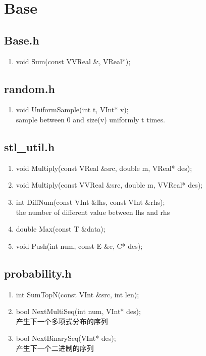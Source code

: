 \chapter{Base}
\section{Base.h}
\begin{enumerate}
\item void Sum(const VVReal \&, VReal*);
\end{enumerate}
\section{random.h}

\begin{enumerate}
\item void UniformSample(int t, VInt* v);
\\sample between 0 and size(v) uniformly t times.
\end{enumerate}

\section{stl\_util.h}
\begin{enumerate}
\item void Multiply(const VReal \&src, double m, VReal* des);
\item void Multiply(const VVReal \&src, double m, VVReal* des);
\item int DiffNum(const VInt \&lhs, const VInt \&rhs);
\\ the number of different value between lhs and rhs
\item double Max(const T \&data);
\item void Push(int num, const E \&e, C* des);
\end{enumerate}

\section{probability.h}
\begin{enumerate}
\item int SumTopN(const VInt \&src, int len);
\item bool NextMultiSeq(int num, VInt* des);
\\ 产生下一个多项式分布的序列
\item bool NextBinarySeq(VInt* des);
\\ 产生下一个二进制的序列
\end{enumerate}

